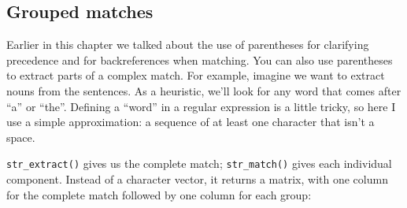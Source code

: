 \documentclass[]{book}
\newenvironment{Shaded}{\begin{snugshade}}{\end{snugshade}}
\newcommand{\KeywordTok}[1]{\textcolor[rgb]{0.13,0.29,0.53}{\textbf{{#1}}}}
\newcommand{\DecValTok}[1]{\textcolor[rgb]{0.00,0.00,0.81}{{#1}}}
\newcommand{\StringTok}[1]{\textcolor[rgb]{0.31,0.60,0.02}{{#1}}}
\newcommand{\CommentTok}[1]{\textcolor[rgb]{0.56,0.35,0.01}{\textit{{#1}}}}
\newcommand{\NormalTok}[1]{{#1}}
\begin{document}
\subsection{Grouped matches}\label{grouped-matches}

Earlier in this chapter we talked about the use of parentheses for
clarifying precedence and for backreferences when matching. You can also
use parentheses to extract parts of a complex match. For example,
imagine we want to extract nouns from the sentences. As a heuristic,
we'll look for any word that comes after ``a'' or ``the''. Defining a
``word'' in a regular expression is a little tricky, so here I use a
simple approximation: a sequence of at least one character that isn't a
space.

\begin{Shaded}
\end{Shaded}

\texttt{str\_extract()} gives us the complete match;
\texttt{str\_match()} gives each individual component. Instead of a
character vector, it returns a matrix, with one column for the complete
match followed by one column for each group:

\begin{Shaded}
\end{Shaded}
\end{document}
